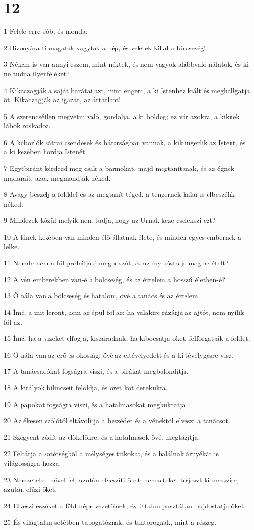 \chapter{12}

\par 1 Felele erre Jób, és monda:
\par 2 Bizonyára ti magatok vagytok a nép, és veletek kihal a bölcseség!
\par 3 Nékem is van annyi eszem, mint néktek, és nem vagyok alábbvaló nálatok, és ki ne tudna ilyenféléket?
\par 4 Kikaczagják a saját barátai azt, mint engem, a ki Istenhez kiált és meghallgatja õt. Kikaczagják az igazat, az ártatlant!
\par 5 A szerencsétlen megvetni való, gondolja, a ki boldog; ez vár azokra, a kiknek lábok roskadoz.
\par 6 A kóborlók sátrai csendesek és bátorságban vannak, a kik ingerlik az Istent, és a ki kezében hordja Istenét.
\par 7 Egyébiránt kérdezd meg csak a barmokat, majd megtanítanak, és az égnek madarait, azok megmondják néked.
\par 8 Avagy beszélj a földdel és az megtanít téged, a tengernek halai is elbeszélik néked.
\par 9 Mindezek közül melyik nem tudja, hogy az Úrnak keze cselekszi ezt?
\par 10 A kinek kezében van minden élõ állatnak élete, és minden egyes embernek a lelke.
\par 11 Nemde nem a fül próbálja-é meg a szót, és az íny kóstolja meg az ételt?
\par 12 A vén emberekben van-é a bölcseség, és az értelem a hosszú életben-é?
\par 13 Õ nála van a bölcseség és hatalom, övé a tanács és az értelem.
\par 14 Ímé, a mit leront, nem az épül föl az; ha valakire rázárja az ajtót, nem nyílik föl az.
\par 15 Ímé, ha a vizeket elfogja, kiszáradnak; ha kibocsátja õket, felforgatják a földet.
\par 16 Õ nála van az erõ és okosság; övé az eltévelyedett és a ki tévelygésre visz.
\par 17 A tanácsadókat fogságra viszi, és a birákat megbolondítja.
\par 18 A királyok bilincseit feloldja, és övet köt derekukra.
\par 19 A papokat fogságra viszi, és a hatalmasokat megbuktatja.
\par 20 Az ékesen szólótól eltávolítja a beszédet és a vénektõl elveszi a tanácsot.
\par 21 Szégyent zúdít az elõkelõkre, és a hatalmasok övét megtágítja.
\par 22 Feltárja a sötétségbõl a mélységes titkokat, és a halálnak árnyékát is világosságra hozza.
\par 23 Nemzeteket növel fel, azután elveszíti õket; nemzeteket terjeszt ki messzire, azután elûzi õket.
\par 24 Elveszi eszöket a föld népe vezetõinek, és úttalan pusztában bujdostatja õket.
\par 25 És világtalan setétben tapogatóznak, és tántorognak, mint a részeg.

